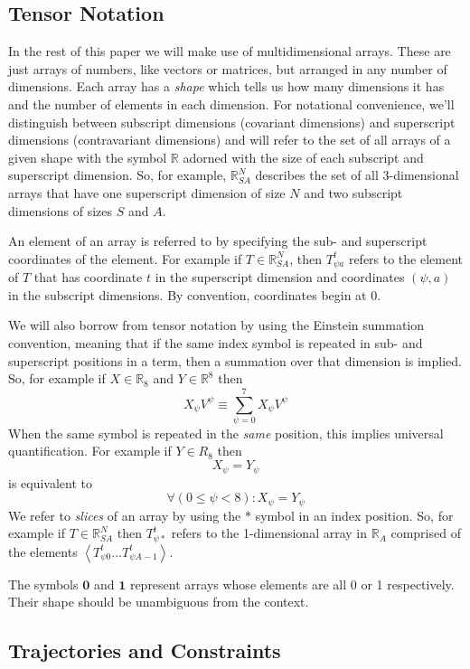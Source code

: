 \documentclass{article}
\begin{document}
\subsection{Tensor Notation}

In the rest of this paper we will make use of multidimensional arrays. These are just arrays of numbers, like vectors or matrices, but arranged in any number of dimensions. Each array has a \textit{shape} which tells us how many dimensions it has and the number of elements in each dimension. For notational convenience, we'll distinguish between subscript dimensions (covariant dimensions) and superscript dimensions (contravariant dimensions) and will refer to the set of all arrays of a given shape with the symbol $\mathbb{R}$ adorned with the size of each subscript and superscript dimension.  So, for example, $\mathbb{R}^N_{SA}$ describes the set of all 3-dimensional arrays that have one superscript dimension of size $N$ and two subscript dimensions of sizes $S$ and $A$.

An element of an array is referred to by specifying the sub- and superscript coordinates of the element. For example if $T \in \mathbb{R}^N_{SA}$, then $T^t_{\psi a}$ refers to the element of $T$ that has coordinate $t$ in the superscript dimension and coordinates $(\psi,a)$ in the subscript dimensions. By convention, coordinates begin at 0.

We will also borrow from tensor notation by using the Einstein summation convention, meaning that if the same index symbol is repeated in sub- and superscript positions in a term, then a summation over that dimension is implied. So, for example if $X \in \mathbb{R}_8$ and $Y \in \mathbb{R}^8$ then
\[
X_\psi V^\psi \equiv \sum_{\psi=0}^7 X_\psi  V^\psi
\]
When the same symbol is repeated in the \textit{same} position, this implies universal quantification. For example if $Y\in R_8$ then
\[
X_\psi = Y_\psi 
\]
is equivalent to
\[
\forall (0 \le \psi < 8) : X_\psi = Y_\psi 
\]
We refer to \textit{slices} of an array by using the $*$ symbol in an index position. So, for example if $T \in \mathbb{R}^N_{SA}$ then $T^t_{\psi *}$ refers to the 1-dimensional array in $\mathbb{R}_A$ comprised of the elements $\left<T^t_{\psi 0}...T^t_{\psi A-1}\right>$.

The symbols $\mathbf{0}$ and $\mathbf{1}$ represent arrays whose elements are all 0 or 1 respectively. Their shape should be unambiguous from the context.

\subsection{Trajectories and Constraints}
\end{document}
